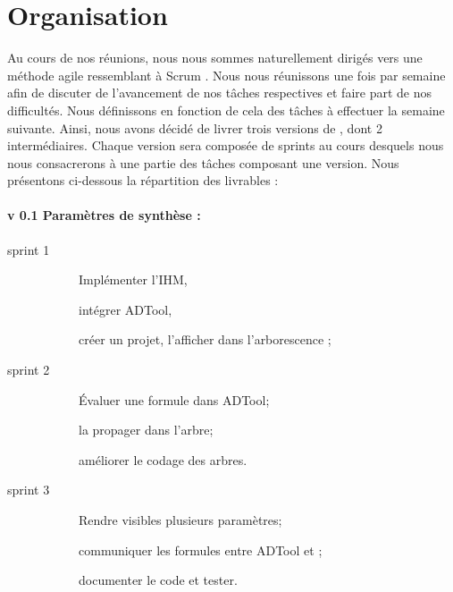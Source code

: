 \section{Organisation}
	\label{sec:livrables}

	Au cours de nos réunions, nous nous sommes naturellement dirigés vers une méthode agile ressemblant à \og Scrum \fg. Nous nous réunissons une fois par semaine afin de discuter de l'avancement de nos tâches respectives et faire part de nos difficultés. Nous définissons en fonction de cela des tâches à effectuer la semaine suivante. Ainsi, nous avons décidé de livrer trois versions de \glasir{}, dont 2 intermédiaires.
	Chaque version sera composée de sprints au cours desquels nous nous consacrerons à une partie des tâches composant une version. %
	Nous présentons ci-dessous la répartition des livrables :
	
	\paragraph{v 0.1 Paramètres de synthèse :}
		\begin{description}
			\item[sprint 1] %
			\begin{description}
		      \item[] 
			  \item[] Implémenter l'IHM,
			  \item[] intégrer ADTool,
			  \item[] créer un projet, l'afficher dans l'arborescence ;
			\end{description}
			\item[sprint 2] 
			\begin{description}
		      \item[] 
			  \item[] Évaluer une formule dans ADTool;
			  \item[] la propager dans l'arbre;
			  \item[] améliorer le codage des arbres.
			\end{description}	
			\item[sprint 3]
			\begin{description}
		      \item[] 
			  \item[] Rendre visibles plusieurs paramètres;
			  \item[] communiquer les formules entre ADTool et \glasir{};
			  \item[]documenter le code et tester.
			\end{description}	

		\end{description}
